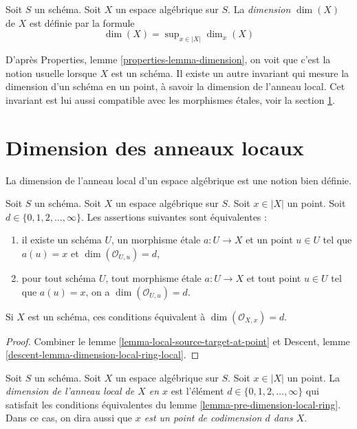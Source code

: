 \begin{definition}
\label{definition-dimension}
Soit $S$ un schéma. Soit $X$ un espace algébrique sur $S$.
La {\it dimension} $\dim(X)$ de $X$ est définie par la formule
$$
\dim(X) = \sup\nolimits_{x \in |X|} \dim_x(X)
$$
\end{definition}

\noindent
D'après
Properties, lemme \ref{properties-lemma-dimension},
on voit que c'est la notion usuelle lorsque $X$ est un schéma.
Il existe un autre invariant qui mesure la dimension d'un schéma
en un point, à savoir la dimension de l'anneau local. Cet invariant
est lui aussi compatible avec les morphismes \'etales, voir la
section \ref{section-dimension-local-ring}.






\section{Dimension des anneaux locaux}
\label{section-dimension-local-ring}

\noindent
La dimension de l'anneau local d'un espace algébrique est une notion bien
définie.

\begin{lemma}
\label{lemma-pre-dimension-local-ring}
Soit $S$ un schéma.
Soit $X$ un espace algébrique sur $S$.
Soit $x \in |X|$ un point.
Soit $d \in \{0, 1, 2, \ldots, \infty\}$.
Les assertions suivantes sont équivalentes :
\begin{enumerate}
\item il existe un schéma $U$, un morphisme \'etale $a : U \to X$ et un point
$u \in U$ tel que $a(u) = x$ et $\dim(\mathcal{O}_{U, u}) = d$,
\item pour tout schéma $U$, tout morphisme \'etale $a : U \to X$ et tout point
$u \in U$ tel que $a(u) = x$, on a $\dim(\mathcal{O}_{U, u}) = d$.
\end{enumerate}
Si $X$ est un schéma, ces conditions équivalent à $\dim(\mathcal{O}_{X, x}) = d$.
\end{lemma}

\begin{proof}
Combiner le
lemme \ref{lemma-local-source-target-at-point} et
Descent, lemme \ref{descent-lemma-dimension-local-ring-local}.
\end{proof}

\begin{definition}
\label{definition-dimension-local-ring}
Soit $S$ un schéma. Soit $X$ un espace algébrique sur $S$. Soit $x \in |X|$
un point. La {\it dimension de l'anneau local de $X$ en $x$} est
l'élément $d \in \{0, 1, 2, \ldots, \infty\}$ qui satisfait les conditions
équivalentes du lemme \ref{lemma-pre-dimension-local-ring}. Dans ce cas, on
dira aussi que {\it $x$ est un point de codimension $d$ dans $X$}.
\end{definition}

